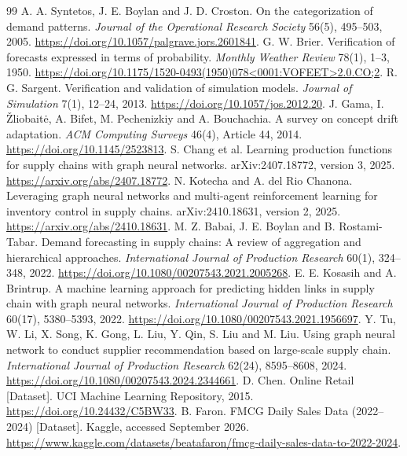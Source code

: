 \documentclass[11pt,a4paper]{article}
\begin{document}
\begin{thebibliography}{99}
 A. A. Syntetos, J. E. Boylan and J. D. Croston. On the categorization of demand patterns. \emph{Journal of the Operational Research Society} 56(5), 495--503, 2005. \url{https://doi.org/10.1057/palgrave.jors.2601841}.
 G. W. Brier. Verification of forecasts expressed in terms of probability. \emph{Monthly Weather Review} 78(1), 1--3, 1950. \url{https://doi.org/10.1175/1520-0493(1950)078<0001:VOFEET>2.0.CO;2}.
 R. G. Sargent. Verification and validation of simulation models. \emph{Journal of Simulation} 7(1), 12--24, 2013. \url{https://doi.org/10.1057/jos.2012.20}.
 J. Gama, I. \v{Z}liobait\.{e}, A. Bifet, M. Pechenizkiy and A. Bouchachia. A survey on concept drift adaptation. \emph{ACM Computing Surveys} 46(4), Article 44, 2014. \url{https://doi.org/10.1145/2523813}.
 S. Chang et al. Learning production functions for supply chains with graph neural networks. arXiv:2407.18772, version 3, 2025. \url{https://arxiv.org/abs/2407.18772}.
 N. Kotecha and A. del Rio Chanona. Leveraging graph neural networks and multi-agent reinforcement learning for inventory control in supply chains. arXiv:2410.18631, version 2, 2025. \url{https://arxiv.org/abs/2410.18631}.
 M. Z. Babai, J. E. Boylan and B. Rostami-Tabar. Demand forecasting in supply chains: A review of aggregation and hierarchical approaches. \emph{International Journal of Production Research} 60(1), 324--348, 2022. \url{https://doi.org/10.1080/00207543.2021.2005268}.
 E. E. Kosasih and A. Brintrup. A machine learning approach for predicting hidden links in supply chain with graph neural networks. \emph{International Journal of Production Research} 60(17), 5380--5393, 2022. \url{https://doi.org/10.1080/00207543.2021.1956697}.
 Y. Tu, W. Li, X. Song, K. Gong, L. Liu, Y. Qin, S. Liu and M. Liu. Using graph neural network to conduct supplier recommendation based on large-scale supply chain. \emph{International Journal of Production Research} 62(24), 8595--8608, 2024. \url{https://doi.org/10.1080/00207543.2024.2344661}.
 D. Chen. Online Retail [Dataset]. UCI Machine Learning Repository, 2015. \url{https://doi.org/10.24432/C5BW33}.
 B. Faron. FMCG Daily Sales Data (2022--2024) [Dataset]. Kaggle, accessed September 2026. \url{https://www.kaggle.com/datasets/beatafaron/fmcg-daily-sales-data-to-2022-2024}.
\end{thebibliography}
\end{document}
